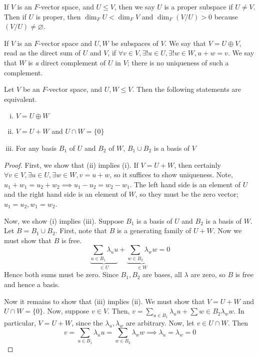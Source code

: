 \begin{remark}
If \( V \) is an \( F \)-vector space, and \( U \leq V \), then we say \( U \) is a proper subspace if \( U \neq V \).
Then if \( U \) is proper, then \( \dim_F U < \dim_F V \) and \( \dim_F ( V / U ) > 0 \) because \( (V/U) \neq \varnothing \).
\end{remark}

\begin{definition}
If \( V \) is an \( F \)-vector space and \( U, W \) be subspaces of \( V \).
We say that \( V = U \oplus V \), read as the direct sum of \( U \) and \( V \), if \( \forall v \in V, \exists! u \in U, \exists! w \in W, u + w = v \).
We say that \( W \) is \textit{a} direct complement of \( U \) in \( V \); there is no uniqueness of such a complement.
\end{definition}
\begin{lemma}
Let \( V \) be an \( F \)-vector space, and \( U, W \leq V \).
Then the following statements are equivalent.
\begin{enumerate}[(i)]
\item \( V = U \oplus W \)
\item \( V = U + W \) and \( U \cap W = \{0\} \)
\item For any basis \( B_1 \) of \( U \) and \( B_2 \) of \( W \), \( B_1 \cup B_2 \) is a basis of \( V \)
\end{enumerate}
\end{lemma}
\begin{proof}
First, we show that (ii) implies (i).
If \( V = U + W \), then certainly \( \forall v \in V, \exists u \in U, \exists w \in W, v = u + w \), so it suffices to show uniqueness.
Note, \( u_1 + w_1 = u_2 + w_2 \implies u_1 - u_2 = w_2 - w_1 \).
The left hand side is an element of \( U \) and the right hand side is an element of \( W \), so they must be the zero vector; \( u_1 = u_2, w_1 = w_2 \).

Now, we show (i) implies (iii).
Suppose \( B_1 \) is a basis of \( U \) and \( B_2 \) is a basis of \( W \).
Let \( B = B_1 \cup B_2 \).
First, note that \( B \) is a generating family of \( U + W \).
Now we must show that \( B \) is free.
\[ \underbrace{\sum_{u \in B_1} \lambda_u u}_{\in U} + \underbrace{\sum_{w \in B_2} \lambda_w w}_{\in W} = 0 \]
Hence both sums must be zero.
Since \( B_1, B_2 \) are bases, all \( \lambda \) are zero, so \( B \) is free and hence a basis.

Now it remains to show that (iii) implies (ii).
We must show that \( V = U + W \) and \( U \cap W = \{0\} \).
Now, suppose \( v \in V \).
Then, \( v = \sum_{u \in B_1} \lambda_u u + \sum{w \in B_2} \lambda_w w \).
In particular, \( V = U + W \), since the \( \lambda_u, \lambda_w \) are arbitrary.
Now, let \( v \in U \cap W \).
Then
\[ v = \sum_{u \in B_1} \lambda_u u = \sum_{w \in B_2} \lambda_w w \implies \lambda_u = \lambda_w = 0 \]
\end{proof}

